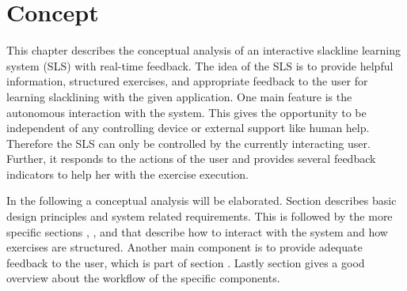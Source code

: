 \chapter{Concept}\label{4_concept}
This chapter describes the conceptual analysis of an interactive slackline learning system (SLS) with real-time feedback. The idea of the SLS is to provide helpful information, structured exercises, and appropriate feedback to the user for learning slacklining with the given application. One main feature is the autonomous interaction with the system. This gives the opportunity to be independent of any controlling device or external support like human help. Therefore the SLS can only be controlled by the currently interacting user. Further, it responds to the actions of the user and provides several feedback indicators to help her with the exercise execution. 

In the following a conceptual analysis will be elaborated. Section \textit{} describes basic design principles and system related requirements. This is followed by the more specific sections \textit{}, \textit{}, and \textit{} that describe how to interact with the system and how exercises are structured. Another main component is to provide adequate feedback to the user, which is part of section \textit{}. Lastly section \textit{} gives a good overview about the workflow of the specific components.







